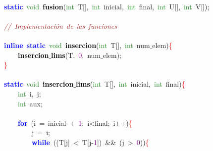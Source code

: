 \mbox{} \\
\mbox{}\textbf{\textcolor{Blue}{static}}\ \textcolor{ForestGreen}{void}\ \textbf{\textcolor{Black}{fusion}}\textcolor{BrickRed}{(}\textcolor{ForestGreen}{int}\ T\textcolor{BrickRed}{[],}\ \textcolor{ForestGreen}{int}\ inicial\textcolor{BrickRed}{,}\ \textcolor{ForestGreen}{int}\ final\textcolor{BrickRed}{,}\ \textcolor{ForestGreen}{int}\ U\textcolor{BrickRed}{[],}\ \textcolor{ForestGreen}{int}\ V\textcolor{BrickRed}{[]);} \\
\mbox{} \\
\mbox{}\textit{\textcolor{Brown}{//\ Implementación\ de\ las\ funciones}} \\
\mbox{} \\
\mbox{}\textbf{\textcolor{Blue}{inline}}\ \textbf{\textcolor{Blue}{static}}\ \textcolor{ForestGreen}{void}\ \textbf{\textcolor{Black}{insercion}}\textcolor{BrickRed}{(}\textcolor{ForestGreen}{int}\ T\textcolor{BrickRed}{[],}\ \textcolor{ForestGreen}{int}\ num$\_$elem\textcolor{BrickRed}{)}\textcolor{Red}{\{} \\
\mbox{}\ \ \ \ \textbf{\textcolor{Black}{insercion$\_$lims}}\textcolor{BrickRed}{(}T\textcolor{BrickRed}{,}\ \textcolor{Purple}{0}\textcolor{BrickRed}{,}\ num$\_$elem\textcolor{BrickRed}{);} \\
\mbox{}\textcolor{Red}{\}} \\
\mbox{} \\
\mbox{}\textbf{\textcolor{Blue}{static}}\ \textcolor{ForestGreen}{void}\ \textbf{\textcolor{Black}{insercion$\_$lims}}\textcolor{BrickRed}{(}\textcolor{ForestGreen}{int}\ T\textcolor{BrickRed}{[],}\ \textcolor{ForestGreen}{int}\ inicial\textcolor{BrickRed}{,}\ \textcolor{ForestGreen}{int}\ final\textcolor{BrickRed}{)}\textcolor{Red}{\{} \\
\mbox{}\ \ \ \ \textcolor{ForestGreen}{int}\ i\textcolor{BrickRed}{,}\ j\textcolor{BrickRed}{;} \\
\mbox{}\ \ \ \ \textcolor{ForestGreen}{int}\ aux\textcolor{BrickRed}{;} \\
\mbox{} \\
\mbox{}\ \ \ \ \textbf{\textcolor{Blue}{for}}\ \textcolor{BrickRed}{(}i\ \textcolor{BrickRed}{=}\ inicial\ \textcolor{BrickRed}{+}\ \textcolor{Purple}{1}\textcolor{BrickRed}{;}\ i\textcolor{BrickRed}{\textless{}}final\textcolor{BrickRed}{;}\ i\textcolor{BrickRed}{++)}\textcolor{Red}{\{} \\
\mbox{}\ \ \ \ \ \ \ \ j\ \textcolor{BrickRed}{=}\ i\textcolor{BrickRed}{;} \\
\mbox{}\ \ \ \ \ \ \ \ \textbf{\textcolor{Blue}{while}}\ \textcolor{BrickRed}{((}T\textcolor{BrickRed}{[}j\textcolor{BrickRed}{]}\ \textcolor{BrickRed}{\textless{}}\ T\textcolor{BrickRed}{[}j\textcolor{BrickRed}{-}\textcolor{Purple}{1}\textcolor{BrickRed}{])}\ \textcolor{BrickRed}{\&\&}\ \textcolor{BrickRed}{(}j\ \textcolor{BrickRed}{\textgreater{}}\ \textcolor{Purple}{0}\textcolor{BrickRed}{))}\textcolor{Red}{\{} \\
